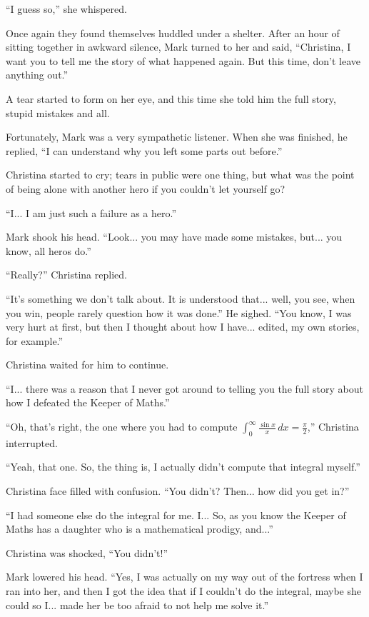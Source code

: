 \documentclass[showtrims,b6paper,draft,10pt]{memoir}
\begin{document}
``I guess so,'' she whispered.

Once again they found themselves huddled under a shelter.  After an hour of sitting together in awkward silence, Mark turned to her and said,  ``Christina, I want you to tell me the story of what happened again.  But this time, don't leave anything out.''

A tear started to form on her eye, and this time she told him the full story, stupid mistakes and all.

Fortunately, Mark was a very sympathetic listener.  When she was finished, he replied, ``I can understand why you left some parts out before.''

Christina started to cry;  tears in public were one thing, but what was the point of being alone with another hero if you couldn't let yourself go?

``I... I am just such a failure as a hero.''

Mark shook his head.  ``Look... you may have made some mistakes, but... you know, all heros do.''

``Really?'' Christina replied.

``It's something we don't talk about.  It is understood that...  well, you see, when you win, people rarely question how it was done.''  He sighed.  ``You know, I was very hurt at first, but then I thought about how I have... edited, my own stories, for example.''

Christina waited for him to continue.

``I... there was a reason that I never got around to telling you the full story about how I defeated the Keeper of Maths.''

``Oh, that's right, the one where you had to compute $\int_0^{\infty}\!\frac{\sin x}{x}\,dx=\frac{\pi}{2}$,'' Christina interrupted.

``Yeah, that one.  So, the thing is, I actually didn't compute that integral myself.''

Christina face filled with confusion.  ``You didn't?  Then... how did you get in?''

``I had someone else do the integral for me.  I... So, as you know the Keeper of Maths has a daughter who is a mathematical prodigy, and...''

Christina was shocked, ``You didn't!''

Mark lowered his head.  ``Yes, I was actually on my way out of the fortress when I ran into her, and then I got the idea that if I couldn't do the integral, maybe she could so I... made her be too afraid to not help me solve it.''
\end{document}
